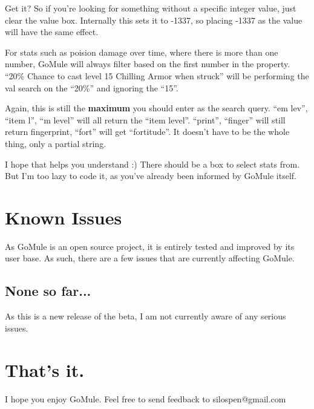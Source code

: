 \documentclass[a4paper,10pt]{article}
\begin{document}
Get it? So if you're looking for something without a specific integer value, just clear the value box. Internally this sets it to -1337, so placing -1337 as the value will have the same effect.

For stats such as poision damage over time, where there is more than one number, GoMule will always filter based on the first number in the property. ``20\% Chance to cast level 15 Chilling Armor when struck'' will be performing the val search on the ``20\%'' and ignoring the ``15''.

Again, this is still the \textbf{maximum} you should enter as the search query. ``em lev'', ``item l'', ``m level'' will all return the ``item level''. ``print'', ``finger'' will still return fingerprint, ``fort'' will get ``fortitude''. It doesn't have to be the whole thing, only a partial string.

I hope that helps you understand :) There should be a box to select stats from. But I'm too lazy to code it, as you've already been informed by GoMule itself.

\section{Known Issues}

As GoMule is an open source project, it is entirely tested and improved by its user base. As such, there are a few issues that are currently affecting GoMule.

\subsection{None so far...}

As this is a new release of the beta, I am not currently aware of any serious issues.

\section{That's it.}

I hope you enjoy GoMule. Feel free to send feedback to silospen@gmail.com
\end{document}
